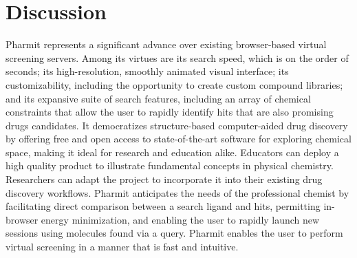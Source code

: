 \section{Discussion}
Pharmit represents a significant advance over existing browser-based virtual screening servers. Among its virtues are its search speed, which is on the order of seconds; its high-resolution, smoothly animated visual interface; its customizability, including the opportunity to create custom compound libraries; and its expansive suite of search features, including an array of chemical constraints that allow the user to rapidly identify hits that are also promising drugs candidates. It democratizes structure-based computer-aided drug discovery by offering free and open access to state-of-the-art software for exploring chemical space, making it ideal for research and education alike. Educators can deploy a high quality product to illustrate fundamental concepts in physical chemistry. Researchers can adapt the project to incorporate it into their existing drug discovery workflows. Pharmit anticipates the needs of the professional chemist by facilitating direct comparison between a search ligand and hits, permitting in-browser energy minimization, and enabling the user to rapidly launch new sessions using molecules found via a query. Pharmit enables the user to perform virtual screening in a manner that is fast and intuitive. 


